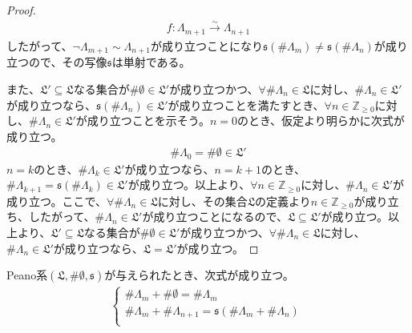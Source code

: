 \documentclass[dvipdfmx]{jsarticle}
\begin{document}
\begin{proof}
\begin{align*}
f:\varLambda_{m + 1}\overset{\sim}{\rightarrow}\varLambda_{n + 1}
\end{align*}
したがって、$\neg\varLambda_{m + 1} \sim \varLambda_{n + 1}$が成り立つことになり$\mathfrak{s}\left( \# \varLambda_{m} \right)\mathfrak{\neq s}\left( \# \varLambda_{n} \right)$が成り立つので、その写像$\mathfrak{s}$は単射である。\par
また、$\mathfrak{L}'\subseteq \mathfrak{L}$なる集合が$\# \emptyset  \in \mathfrak{L}'$が成り立つかつ、$\forall\# \varLambda_{n}\in \mathfrak{L}$に対し、$\# \varLambda_{n} \in \mathfrak{L}'$が成り立つなら、$\mathfrak{s}\left( \# \varLambda_{n} \right) \in \mathfrak{L}'$が成り立つことを満たすとき、$\forall n \in \mathbb{Z}_{\geq 0}$に対し、$\# \varLambda_{n} \in \mathfrak{L}'$が成り立つことを示そう。$n = 0$のとき、仮定より明らかに次式が成り立つ。
\begin{align*}
\# \varLambda_{0} = \# \emptyset  \in \mathfrak{L}'
\end{align*}
$n = k$のとき、$\# \varLambda_{k} \in \mathfrak{L}'$が成り立つなら、$n = k + 1$のとき、$\# \varLambda_{k + 1} = \mathfrak{s}\left( \# \varLambda_{k} \right) \in \mathfrak{L}'$が成り立つ。以上より、$\forall n \in \mathbb{Z}_{\geq 0}$に対し、$\# \varLambda_{n} \in \mathfrak{L}'$が成り立つ。ここで、$\forall\# \varLambda_{n}\in \mathfrak{L}$に対し、その集合$\mathfrak{L}$の定義より$n \in \mathbb{Z}_{\geq 0}$が成り立ち、したがって、$\# \varLambda_{n} \in \mathfrak{L}'$が成り立つことになるので、$\mathfrak{L \subseteq}\mathfrak{L}'$が成り立つ。以上より、$\mathfrak{L}'\subseteq \mathfrak{L}$なる集合が$\# \emptyset  \in \mathfrak{L}'$が成り立つかつ、$\forall\# \varLambda_{n}\in \mathfrak{L}$に対し、$\# \varLambda_{n} \in \mathfrak{L}'$が成り立つなら、$\mathfrak{L} =\mathfrak{L}'$が成り立つ。
\end{proof}
\begin{thm}\label{1.2.8.12}
Peano系$\left( \mathfrak{L,}\# \emptyset ,\mathfrak{s} \right)$が与えられたとき、次式が成り立つ。
\begin{align*}
\left\{ \begin{matrix}
\# \varLambda_{m} + \# \emptyset  = \# \varLambda_{m} \\
\# \varLambda_{m} + \# \varLambda_{n + 1} = \mathfrak{s}\left( \# \varLambda_{m} + \# \varLambda_{n} \right) \\
\end{matrix} \right.\ 
\end{align*}
\end{thm}\par
\end{document}
